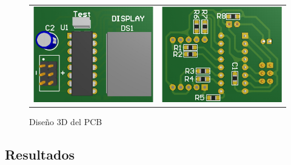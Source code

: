 \begin{figure}[H]
    \centering
    \begin{tabular}{c c}
        \includegraphics[scale=0.3]{../EJ7/Recursos/3d_top_visualizacion.PNG} &
        \includegraphics[scale=0.3]{../EJ7/Recursos/3d_bottom_visualizacion.PNG} 
    \end{tabular}
    \caption{Dise\~no 3D del PCB}
    \label{fig:3d_visualizacion}
\end{figure}

\subsection{Resultados}

